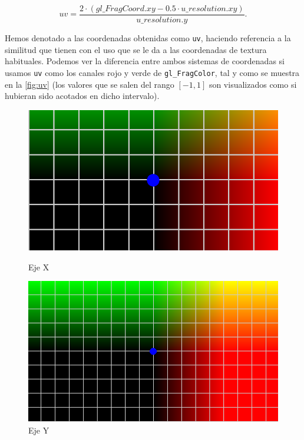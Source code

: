 \begin{equation*}
    uv = \frac{2\cdot(gl\_FragCoord.xy - 0.5\cdot u\_resolution.xy)}{u\_resolution.y}.
\end{equation*}

Hemos denotado a las coordenadas obtenidas como \texttt{uv}, haciendo referencia a la similitud que tienen con el uso que se le da a las coordenadas de textura habituales. Podemos ver la diferencia entre ambos sistemas de coordenadas si usamos \texttt{uv} como los canales rojo y verde de \texttt{gl\_FragColor}, tal y como se muestra en la \autoref{fig:uv} (los valores que se salen del rango $[-1,1]$ son visualizados como si hubieran sido acotados en dicho intervalo).\newline

\begin{figure}[htbp]
    \centering
    \begin{minipage}[b]{0.45\textwidth}
        \centering
        \includegraphics[width=\textwidth]{Plantilla-TFG-master/img/normX.png}
        \caption{Eje X}
    \end{minipage}
    \hfill
    \begin{minipage}[b]{0.45\textwidth}
        \centering
        \includegraphics[width=\textwidth]{Plantilla-TFG-master/img/normY.png}
        \caption{Eje Y}
    \end{minipage}
    

\end{figure}
